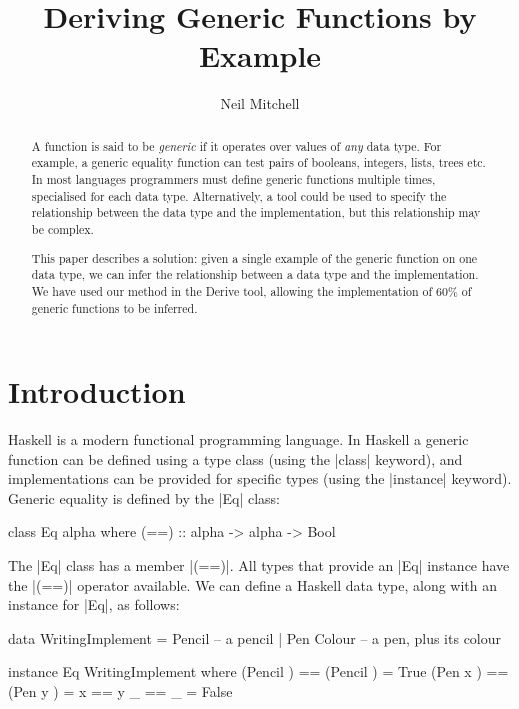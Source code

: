 \documentclass{llncs}
\begin{document}
\title{Deriving Generic Functions by Example}
\author{Neil Mitchell}


\maketitle

\begin{abstract}
A function is said to be \textit{generic} if it operates over values of \textit{any} data type. For example, a generic equality function can test pairs of booleans, integers, lists, trees etc. In most languages programmers must define generic functions multiple times, specialised for each data type. Alternatively, a tool could be used to specify the relationship between the data type and the implementation, but this relationship may be complex.

This paper describes a solution: given a single example of the generic function on one data type, we can infer the relationship between a data type and the implementation. We have used our method in the Derive tool, allowing the implementation of 60\% of generic functions to be inferred.
\end{abstract}

\section{Introduction}

Haskell \cite{haskell} is a modern functional programming language. In Haskell a generic function can be defined using a type class \cite{wadler:type_classes} (using the |class| keyword), and implementations can be provided for specific types (using the |instance| keyword). Generic equality is defined by the |Eq| class:

\begin{code}
class Eq alpha where
    (==) :: alpha -> alpha -> Bool
\end{code}

The |Eq| class has a member |(==)|. All types that provide an |Eq| instance have the |(==)| operator available. We can define a Haskell data type, along with an instance for |Eq|, as follows:

\begin{code}
data WritingImplement  =  Pencil       -- a pencil
                       |  Pen Colour   -- a pen, plus its colour

instance Eq WritingImplement where
    (Pencil     )  == (Pencil     )  = True
    (Pen     x  )  == (Pen     y  )  = x == y
    _              == _              = False
\end{code}
\end{document}
